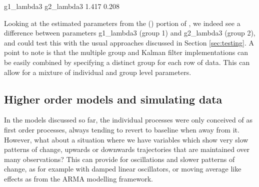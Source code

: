 \documentclass[nojss]{jss}\usepackage[]{graphicx}\usepackage[]{color}
\begin{document}
\begin{Schunk}
\begin{Soutput}
g1_lambda3 g2_lambda3 
     1.417      0.208 
\end{Soutput}
\end{Schunk}

Looking at the estimated parameters from the  () portion of , we indeed see a difference between parameters g1\_lambda3 (group 1) and g2\_lambda3 (group 2), and could test this with the usual approaches discussed in Section \ref{sec:testing}. A point to note is that the multiple group and Kalman filter implementations can be easily combined by specifying a distinct group for each row of data. This can allow for a mixture of individual and group level parameters.

\subsection{Higher order models and simulating data} \label{sec:diffusiondynamics}\nopagebreak
In the models discussed so far, the individual processes were only conceived of as first order processes, always tending to revert to baseline when away from it. However, what about a situation where we have variables which show very slow patterns of change, upwards or downwards trajectories that are maintained over many observations? This can provide for oscillations and slower patterns of change, as for example with damped linear oscillators, or moving average like effects as from the ARMA modelling framework.
\end{document}
